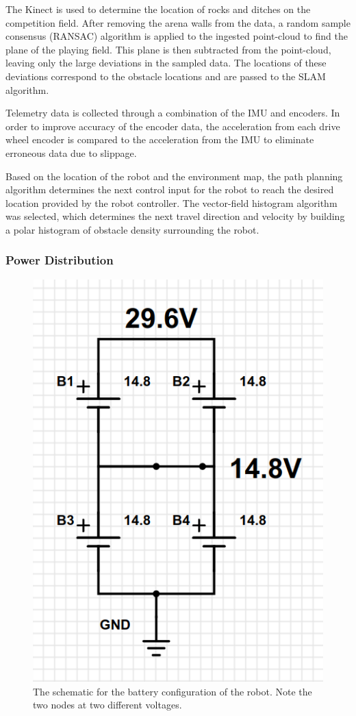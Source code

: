 \documentclass[class=article, crop=false]{standalone}
\begin{document}
	The Kinect is used to determine the location of rocks and ditches on the competition field. After removing the arena walls from the data, a random sample consensus (RANSAC) algorithm is applied to the ingested point-cloud to find the plane of the playing field. This plane is then subtracted from the point-cloud, leaving only the large deviations in the sampled data. The locations of these deviations correspond to the obstacle locations and are passed to the SLAM algorithm.

	Telemetry data is collected through a combination of the IMU and encoders. In order to improve accuracy of the encoder data, the acceleration from each drive wheel encoder is compared to the acceleration from the IMU to eliminate erroneous data due to slippage.
	
	Based on the location of the robot and the environment map, the path planning algorithm determines the next control input for the robot to reach the desired location provided by the robot controller. The vector-field histogram algorithm was selected, which determines the next travel direction and velocity by building a polar histogram of obstacle density surrounding the robot.

	
	\subsubsection{Power Distribution}
	\FloatBarrier
	\begin{figure}
	\centering
	 \includegraphics[width=0.8\linewidth]{09_Figures/power-config.jpg}
	 \caption{The schematic for the battery configuration of the robot. Note the two nodes at two different voltages.}
	 \label{fig:power-config}
	\end{figure}
	\FloatBarrier
	
\end{document}
